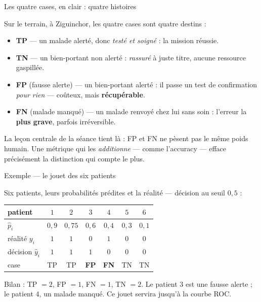 \documentclass[aspectratio=169,11pt]{beamer}
\begin{document}
\begin{frame}{Les quatre cases, en clair : quatre histoires}
\begin{ucadex}
{\small Sur le terrain, à Ziguinchor, les quatre cases sont quatre destins :
\begin{itemize}\small
  \item \textbf{TP} — un malade alerté, donc \emph{testé et soigné} : la mission réussie.
  \item \textbf{TN} — un bien-portant non alerté : \emph{rassuré} à juste titre, aucune ressource gaspillée.
  \item \textbf{FP} (fausse alerte) — un bien-portant alerté : il passe un test de confirmation \emph{pour rien} — coûteux, mais \textbf{récupérable}.
  \item \textbf{FN} (malade manqué) — un malade renvoyé chez lui sans soin : l'erreur la \textbf{plus grave}, parfois irréversible.
\end{itemize}
La leçon centrale de la séance tient là : FP et FN ne pèsent pas le même poids humain. Une métrique qui les \emph{additionne} — comme l'accuracy — efface précisément la distinction qui compte le plus.}
\end{ucadex}
\end{frame}

\begin{frame}{Exemple — le jouet des six patients}
\begin{ucadex}
{\small Six patients, leurs probabilités prédites et la réalité — décision au seuil $0{,}5$ :
\begin{center}\footnotesize\renewcommand{\arraystretch}{1.05}\begin{tabular}{l|cccccc}
patient & $1$ & $2$ & $3$ & $4$ & $5$ & $6$\\\hline
$\hat p_i$ & $0{,}9$ & $0{,}75$ & $0{,}6$ & $0{,}4$ & $0{,}3$ & $0{,}1$\\
réalité $y_i$ & $1$ & $1$ & $0$ & $1$ & $0$ & $0$\\
décision $\hat y_i$ & $1$ & $1$ & $1$ & $0$ & $0$ & $0$\\
case & TP & TP & \textbf{FP} & \textbf{FN} & TN & TN\\
\end{tabular}\end{center}
Bilan : TP $= 2$, FP $= 1$, FN $= 1$, TN $= 2$. Le patient $3$ est une fausse alerte ; le patient $4$, un malade manqué. Ce jouet servira jusqu'à la courbe ROC.}
\end{ucadex}
\end{frame}
\end{document}
